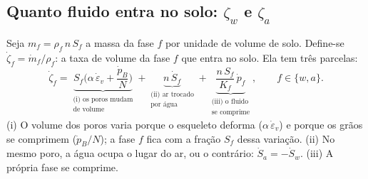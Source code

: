 \documentclass[11pt,a4paper]{article}
\begin{document}
\subsection{\texorpdfstring{Quanto fluido entra no solo: $\zeta_w$ e $\zeta_a$}{Quanto fluido entra no solo}}
\label{sec:zeta}
Seja $m_f=\rho_f\,n\,S_f$ a massa da fase $f$ por unidade de volume de solo. Define-se
$\dot\zeta_f=\dot m_f/\rho_f$: a taxa de volume da fase $f$ que entra no solo. Ela tem
três parcelas:
\begin{equation}
\dot\zeta_f=
\underbrace{S_f\Big(\alpha\,\dot\varepsilon_v+\frac{\dot p_B}{N}\Big)}_{\substack{\text{(i) os poros mudam}\\\text{de volume}}}
+\underbrace{n\,\dot S_f}_{\substack{\text{(ii) ar trocado}\\\text{por água}}}
+\underbrace{\frac{n\,S_f}{K_f}\,\dot p_f}_{\substack{\text{(iii) o fluido}\\\text{se comprime}}},
\qquad f\in\{w,a\}.
\label{eq:zeta}
\end{equation}
(i) O volume dos poros varia porque o esqueleto deforma ($\alpha\,\dot\varepsilon_v$) e
porque os grãos se comprimem ($\dot p_B/N$); a fase $f$ fica com a fração $S_f$ dessa
variação. (ii) No mesmo poro, a água ocupa o lugar do ar, ou o contrário:
$\dot S_a=-\dot S_w$. (iii) A própria fase se comprime.
\end{document}
